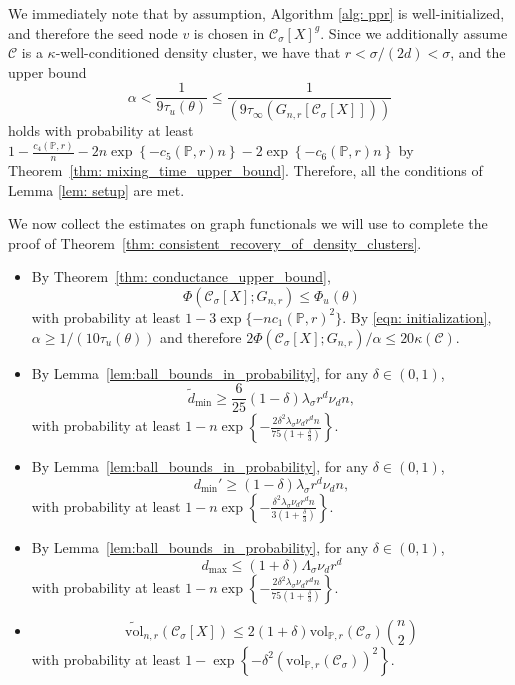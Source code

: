 \documentclass[11pt,twoside]{article}
\newcommand{\set}[1]{\left\{#1\right\}}
\newcommand{\vol}{\mathrm{vol}}
\newcommand{\1}{\mathbf{1}}
\newcommand{\Phibf}{\Phi_{u}}
\newcommand{\taubf}{\tau_{u}}
\newcommand{\Xbf}{X}             %
\newcommand{\Pbb}{\mathbb{P}}
\newcommand{\Cset}{\mathcal{C}}
\newcommand{\Csig}{\Cset_{\sigma}}
\newcommand{\degminpr}{d_{\min}'}
\newcommand{\degminwt}{\widetilde{d}_{\min}}
\begin{document}
We immediately note that by assumption, Algorithm \ref{alg: ppr} is well-initialized, and therefore the seed node $v$ is chosen in $\Csig[\Xbf]^g$. Since we additionally assume $\Cset$ is a $\kappa$-well-conditioned density cluster, we have that $r < \sigma/(2d) < \sigma$, and the upper bound 
\begin{equation*}
\alpha < \frac{1}{9\tau_{u}(\theta)} \leq \frac{1}{(9 \tau_{\infty}(G_{n,r}[\Csig[\Xbf]]))}
\end{equation*}
holds with probability at least $1 - \frac{c_4(\Pbb,r)}{n} - 2n\exp\set{-c_5(\Pbb,r)n} - 2\exp\set{-c_6(\Pbb,r)n}$ by Theorem~\ref{thm: mixing_time_upper_bound}.
Therefore, all the conditions of Lemma \ref{lem: setup} are met. 

We now collect the estimates on graph functionals we will use to complete the proof of Theorem~\ref{thm: consistent_recovery_of_density_clusters}. 
\begin{itemize}
	\item By Theorem~\ref{thm: conductance_upper_bound},
	\begin{equation*}
	\Phi(\Csig[\Xbf]; G_{n,r}) \leq \Phibf(\theta) 
	\end{equation*}
	with probability at least $1 - 3\exp\{-nc_1(\Pbb,r)^2\}$. By \eqref{eqn: initialization}, $\alpha \geq 1/(10 \taubf(\theta))$ and therefore $2 \Phi(\Csig[\Xbf]; G_{n,r})/\alpha \leq 20 \kappa(\Cset)$.
	\item By Lemma~\ref{lem:ball_bounds_in_probability}, for any $\delta \in (0,1)$,
	\begin{equation*}
	\degminwt \geq \frac{6}{25}(1 - \delta) \lambda_{\sigma} r^d \nu_d n,
	\end{equation*}
	with probability at least $1 - n\exp\set{-\frac{2 \delta^2 \lambda_{\sigma} \nu_d r^d n}{75(1 + \frac{\delta}{3})}}$.
	\item By Lemma~\ref{lem:ball_bounds_in_probability}, for any $\delta \in (0,1)$,
	\begin{equation*}
	\degminpr \geq (1 - \delta) \lambda_{\sigma} r^d \nu_d n,
	\end{equation*}
	with probability at least $1 - n\exp\set{-\frac{\delta^2 \lambda_{\sigma} \nu_d r^d n}{3(1 + \frac{\delta}{3})}}$.
	
	\item By Lemma~\ref{lem:ball_bounds_in_probability}, for any $\delta \in (0,1)$,
	\begin{equation*}
	d_{\max} \leq (1 + \delta) \Lambda_{\sigma} \nu_d r^d
	\end{equation*}
	with probability at least $1 - n\exp\set{-\frac{2\delta^2 \lambda_{\sigma} \nu_d r^d n}{75(1 + \frac{\delta}{3})}}$.
	
	\item 
	\begin{equation*}
	\widetilde{\vol}_{n,r}(\Csig[\Xbf]) \leq 2(1 + \delta) \vol_{\Pbb,r}(\Csig){n \choose 2}
	\end{equation*}
	with probability at least $1 - \exp\set{-\delta^2 (\vol_{\Pbb,r}(\Csig))^2}$.
\end{itemize}
\end{document}
